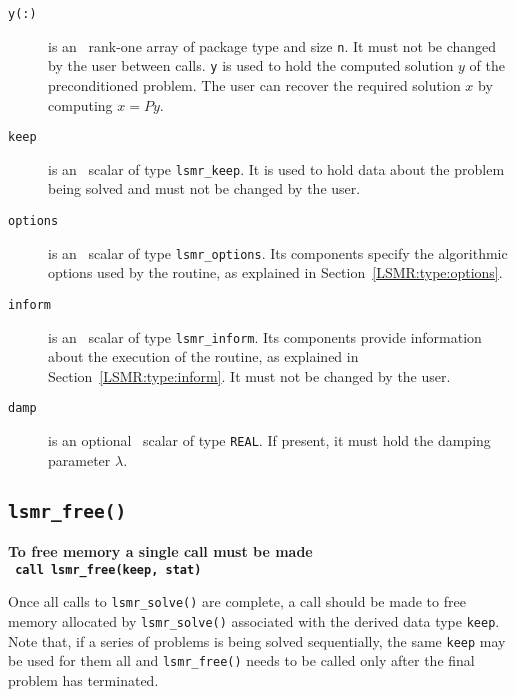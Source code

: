 \begin{description}
\item[\texttt{y(:)}] is an \intentinout\ rank-one array of package type 
and size {\tt n}. It must not be changed by the user between calls.
{\tt y} is used to hold the computed solution $y$ of the preconditioned problem.
The user can recover the required solution $x$ by computing $x = Py$.

\item[\texttt{keep}] is an \intentinout\ scalar of type
{\tt lsmr\_keep}. It is used to hold data about the problem being
solved and must not be changed by the user.

\item[\texttt{options}] is an \intentin\ scalar of type {\tt lsmr\_options}.
Its components specify the algorithmic options used by the routine, as
explained in Section~\ref{LSMR:type:options}.

\item[\texttt{inform}] is an \intentinout\ scalar of type
{\tt lsmr\_inform}. Its components provide information about the execution
of the routine, as explained in Section~\ref{LSMR:type:inform}.
It must not be changed by the user.

\item[\texttt{damp}] is an optional \intentin\ scalar of type
{\tt REAL}. If present, it must hold the damping parameter $\lambda$.

\end{description}



\subsection{\texttt{lsmr\_free()}}
\textbf{To free memory a single call must be made\\
   \vspace{0.2cm}
    \texttt{ \hspace*{0.2cm}
      call lsmr\_free(keep, stat)
   }
}
\vspace{0.2cm}

\noindent
Once all  calls to \texttt{lsmr\_solve()} are complete,
a call should be made to free memory  allocated by
\texttt{lsmr\_solve()}  associated with the derived data type {\tt keep}.
Note that, if a series of problems is being solved sequentially, the same {\tt keep}
may be used for them all and {\tt lsmr\_free()} needs to be called only
after the final problem has terminated.

